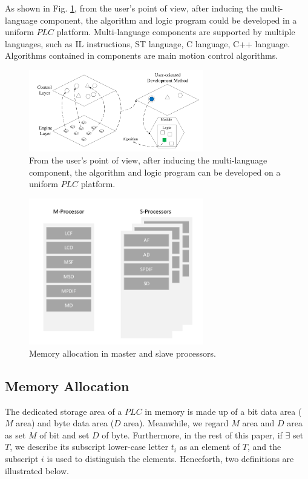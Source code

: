 \documentclass[journal,UTF8]{IEEEtran}
\begin{document}
As shown in Fig. \ref{fig:SoftwareStructure}, from the user's point of view, after inducing the multi-language component, the algorithm and logic program could be developed in a uniform $PLC$ platform. Multi-language components are supported by multiple languages, such as IL instructions, ST language, C language, C++ language. Algorithms contained in components are main motion control algorithms.
\begin{figure}
	\centering
	\includegraphics[width=3in]{fig/FIG3.pdf}
	\caption{ From the user's point of view, after inducing the multi-language component, the algorithm and logic program can be developed on a uniform $PLC$ platform.}
	\label{fig:SoftwareStructure}
\end{figure}


\begin{figure}
	\centering
	\includegraphics[width=3in]{fig/FIG4.pdf}
	\caption{ Memory allocation in master and slave processors.}
	\label{fig:Memory}
\end{figure}

\subsection{Memory Allocation}  

The dedicated storage area of a $PLC$ in memory is made up of a bit data area ($M$ area) and byte data area ($D$ area). Meanwhile, we regard $M$ area and $D$ area as set $M$ of bit and set $D$ of byte. Furthermore, in the rest of this paper, if $\exists$ set $T$, we describe its subscript lower-case letter $t_i$ as an element of $T$, and the subscript $i$ is used to distinguish the elements. Henceforth, two definitions are illustrated below.
\end{document}
